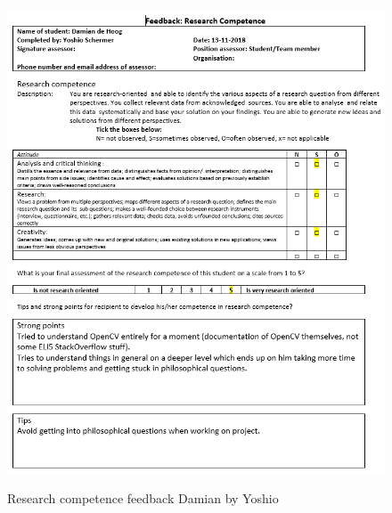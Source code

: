 \documentclass[12pt]{article}
\begin{document}
	\begin{figure}[p!]
		\centering
		\includegraphics[width=\columnwidth]{ResSklDamian3.PNG}\\
		\caption{Research competence feedback Damian by Yoshio}
	\end{figure}
\end{document}
